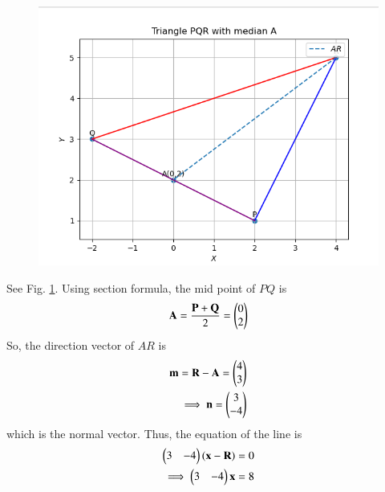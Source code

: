 	\begin{figure}[!ht]
		\centering
 \includegraphics[width=\columnwidth]{chapters/11/10/2/9/figs/line.png}
		\caption{}
		\label{fig:11/10/2/9}
  	\end{figure}
	See Fig. 
		\ref{fig:11/10/2/9}.
Using section formula, the mid point of $PQ$ is
\begin{align}
\mathbf{A} = \frac{\mathbf{P} +\mathbf{Q} }{2}
	= {\begin{pmatrix}0\\2\end{pmatrix}}
\end{align} 
So, the direction vector of $AR$ is 
\begin{align}
	\mathbf{m} ={\mathbf{R} - \mathbf{A}}
= \begin{pmatrix}4 \\ 3\end{pmatrix}
\\
	\implies \mathbf{n} = 
 \begin{pmatrix}3 \\ -4\end{pmatrix}
\end{align}
which is the normal vector.  Thus,
the equation of the line is 
\begin{align}
	\begin{pmatrix}3 & -4\end{pmatrix}\left(\mathbf{x} - \mathbf{R}\right) = 0
	\\
	\implies 
	\begin{pmatrix}3 & -4\end{pmatrix}\mathbf{x} =8 
\end{align}
